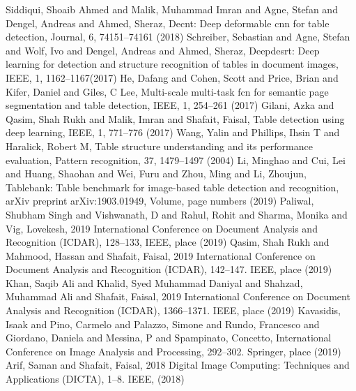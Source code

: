 \begin{thebibliography}{}
%
%
Siddiqui, Shoaib Ahmed and Malik, Muhammad Imran and Agne, Stefan and Dengel, Andreas and Ahmed, Sheraz, Decnt: Deep deformable cnn for table detection, Journal, 6, 74151--74161 (2018)
Schreiber, Sebastian and Agne, Stefan and Wolf, Ivo and Dengel, Andreas and Ahmed, Sheraz, Deepdesrt: Deep learning for detection and structure recognition of tables in document images, IEEE, 1, 1162--1167(2017)
He, Dafang and Cohen, Scott and Price, Brian and Kifer, Daniel and Giles, C Lee, Multi-scale multi-task fcn for semantic page segmentation and table detection, IEEE, 1, 254--261 (2017)
Gilani, Azka and Qasim, Shah Rukh and Malik, Imran and Shafait, Faisal, Table detection using deep learning, IEEE, 1, 771--776 (2017)
Wang, Yalin and Phillips, Ihsin T and Haralick, Robert M, Table structure understanding and its performance evaluation, Pattern recognition, 37, 1479--1497 (2004)
Li, Minghao and Cui, Lei and Huang, Shaohan and Wei, Furu and Zhou, Ming and Li, Zhoujun, Tablebank: Table benchmark for image-based table detection and recognition, arXiv preprint arXiv:1903.01949, Volume, page numbers (2019)
Paliwal, Shubham Singh and Vishwanath, D and Rahul, Rohit and Sharma, Monika and Vig, Lovekesh, 2019 International Conference on Document Analysis and Recognition (ICDAR), 128--133, IEEE, place (2019)
Qasim, Shah Rukh and Mahmood, Hassan and Shafait, Faisal, 2019 International Conference on Document Analysis and Recognition (ICDAR), 142--147. IEEE, place (2019)
Khan, Saqib Ali and Khalid, Syed Muhammad Daniyal and Shahzad, Muhammad Ali and Shafait, Faisal, 2019 International Conference on Document Analysis and Recognition (ICDAR), 1366--1371. IEEE, place (2019)
Kavasidis, Isaak and Pino, Carmelo and Palazzo, Simone and Rundo, Francesco and Giordano, Daniela and Messina, P and Spampinato, Concetto, International Conference on Image Analysis and Processing, 292--302. Springer, place (2019)
Arif, Saman and Shafait, Faisal, 2018 Digital Image Computing: Techniques and Applications (DICTA), 1--8. IEEE, (2018)

\end{thebibliography}
